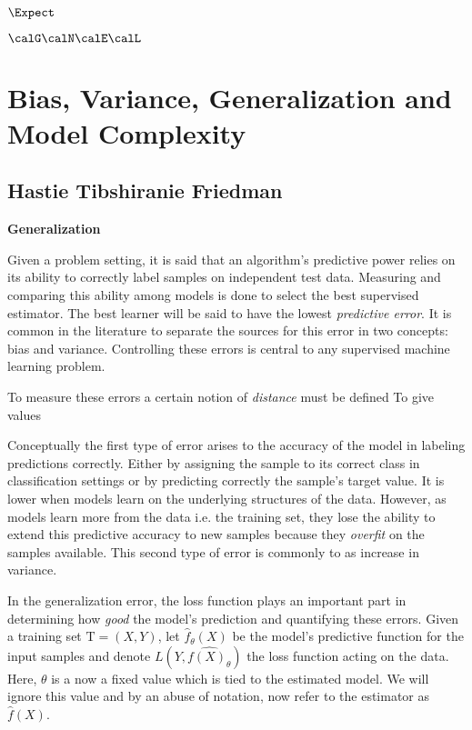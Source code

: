  
$\Expect$

$\calG \calN \calE \calL$

\section{Bias, Variance, Generalization and Model Complexity}
 
 
 \subsection{Hastie Tibshiranie Friedman}
 
 \textbf{Generalization}
 
 Given a problem setting, it is said that an algorithm's predictive power relies on its ability to correctly label samples on independent test data. Measuring and comparing this ability among models is done to select the best supervised estimator.  The best learner will be said to have the lowest \textit{predictive error}. It is common in the literature \cite{james-biasVarianceGeneral} to separate the sources for this error in two concepts: bias and variance. Controlling these errors is central to any supervised machine learning problem.
 
To measure these errors a certain notion of \textit{distance} must be defined To give values 
 
Conceptually the first type of error arises to the accuracy of the model in labeling predictions correctly. Either by assigning the sample to its correct class in classification settings or by predicting correctly the sample's target value. It is lower when models learn on the underlying structures of the data. However, as models learn more from the data i.e. the training set, they lose the ability to extend this predictive accuracy to new samples because they \textit{overfit} on the samples available. This second type of error is commonly to as increase in variance.
 
 In the generalization error, the loss function plays an important part in determining how \textit{good} the model's prediction and quantifying these errors. Given a training set $\mathrm{T} = (X,Y)$, let $\hat{f}_{\theta}(X)$ be the model's predictive function for the input samples and denote $L( Y,\hat{f(X)_{\theta}} )$ the loss function acting on the data. Here, $\theta$ is a now a fixed value which is tied to the estimated model.  We will ignore this value and by an abuse of notation, now refer to the estimator as $\hat{f}(X)$. 

